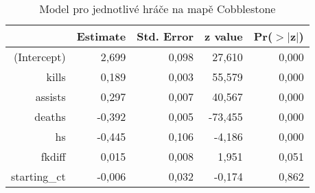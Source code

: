 \begin{table}[H]
\centering
\begin{tabular}{rrrrr}
  \hline
 & Estimate & Std. Error & z value & Pr($>$$|$z$|$) \\ 
  \hline
(Intercept) & 2,699 & 0,098 & 27,610 & 0,000 \\ 
  kills & 0,189 & 0,003 & 55,579 & 0,000 \\ 
  assists & 0,297 & 0,007 & 40,567 & 0,000 \\ 
  deaths & -0,392 & 0,005 & -73,455 & 0,000 \\ 
  hs & -0,445 & 0,106 & -4,186 & 0,000 \\ 
  fkdiff & 0,015 & 0,008 & 1,951 & 0,051 \\ 
  starting\_ct & -0,006 & 0,032 & -0,174 & 0,862 \\ 
   \hline
\end{tabular}
\caption{\label{tab:player_model_Cobblestone}Model pro jednotlivé hráče na mapě Cobblestone} 
\end{table}
